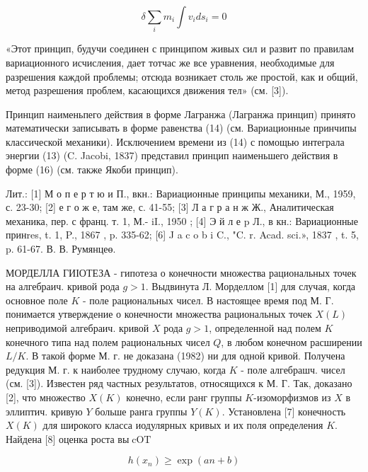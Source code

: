 \documentclass[10pt]{article}
\begin{document}
\[

\delta \sum_{i} m_{i} \int v_{i} d s_{i}=0

\]



«Этот принцип, будучи соединен с принципом живых сил и развит по правилам вариационного исчисления, дает тотчас же все уравнения, необходимые для разрешения каждой проблемы; отсюда возникает столь же простой, как и общий, метод разрешения проблем, касающихся движения тел» (см. [3]).



Принцип наименьпего действия в форме Лагранжа (Лагранжа принцип) принято математически записывать в форме равенства (14) (см. Вариационные принчипы классической механики). Исключением времени из (14) с помощью интеграла энергии (13) (C. Jacobi, 1837) представил принцип наименьшего действия в форме (16) (см. также Якоби принцип).



Лит.: [1] М о п е р т ю и П., вкн.: Вариационные принципы механики, М., 1959, с. 23-30; [2] е г о ж е, там же, с. 41-55; [3] Л а г р а н ж Ж., Аналитическая механика, пер. с франц. т. 1, М.- iI., 1950 ; [4] Э й л е p Л., в кн.: Вариационные принres, t. 1, P., 1867 , p. 335-62; [6] J a c o b i C., "C. r. Acad. sci.», 1837 , t. 5, p. 61-67. В. В. Румянцеө.



МОРДЕЛЛА ГИІОТЕЗА - гипотеза о конечности множества рациональных точек на алгебраич. кривой рода $g>1$. Выдвинута Л. Морделлом [1] для случая, когда основное поле $K$ - поле рациональных чисел. В настоящее время под М. Г. понимается утверждение о конечности множества рациональных точек $X(L)$ неприводимой алгебраич. кривой $X$ рода $g>1$, определенной над полем $K$ конечного типа над полем рациональных чисел $Q$, в любом конечном расширении $L / K$. В такой форме М. г. не доказана (1982) ни для одной кривой. Получена редукция М. г. к наиболее трудному случаю, когда $K$ - поле алгебрашч. чисел (см. [3]). Известен ряд частных результатов, относящихся к М. Г. Так, доказано [2], что множество $X(K)$ конечно, если ранг группы $K$-изоморфизмов из $X$ в эллиптич. кривую $Y$ больше ранга группы $Y(K)$. Установлена [7] конечность $X(K)$ для широкого класса иодулярных кривых и их поля определения $K$. Найдена [8] оценка роста вы$\operatorname{cOT}$



\[

h\left(x_{n}\right) \geqslant \exp (a n+b)

\]
\end{document}
